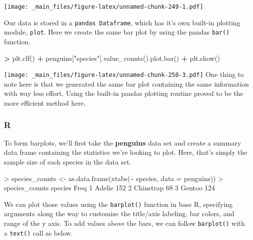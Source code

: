 \documentclass[
]{book}
\newenvironment{Shaded}{\begin{snugshade}}{\end{snugshade}}
\newcommand{\AttributeTok}[1]{\textcolor[rgb]{0.77,0.63,0.00}{#1}}
\newcommand{\DecValTok}[1]{\textcolor[rgb]{0.00,0.00,0.81}{#1}}
\newcommand{\FunctionTok}[1]{\textcolor[rgb]{0.00,0.00,0.00}{#1}}
\newcommand{\NormalTok}[1]{#1}
\newcommand{\OperatorTok}[1]{\textcolor[rgb]{0.81,0.36,0.00}{\textbf{#1}}}
\newcommand{\OtherTok}[1]{\textcolor[rgb]{0.56,0.35,0.01}{#1}}
\newcommand{\SpecialCharTok}[1]{\textcolor[rgb]{0.00,0.00,0.00}{#1}}
\newcommand{\StringTok}[1]{\textcolor[rgb]{0.31,0.60,0.02}{#1}}
\begin{document}
\texttt{[image: \_main\_files/figure-latex/unnamed-chunk-249-1.pdf]}

Our data is stored in a \texttt{pandas\ Dataframe}, which has it's own built-in plotting module, \texttt{plot}. Here we create the same bar plot by using the pandas \texttt{bar()} function.

\begin{Shaded}
\begin{Highlighting}[]
\OperatorTok{\textgreater{}}\NormalTok{ plt.clf()}
\OperatorTok{+}\NormalTok{ penguins[}\StringTok{"species"}\NormalTok{].value\_counts().plot.bar()}
\OperatorTok{+}\NormalTok{ plt.show()}
\end{Highlighting}
\end{Shaded}

\texttt{[image: \_main\_files/figure-latex/unnamed-chunk-250-3.pdf]}
One thing to note here is that we generated the same bar plot containing the same information with way less effort. Using the built-in pandas plotting routine proved to be the more efficient method here.

\hypertarget{r-40}{%
\subsubsection*{R}\label{r-40}}

To form barplots, we'll first take the \textbf{penguins} data set and create a summary data frame containing the statistics we're looking to plot. Here, that's simply the sample size of each species in the data set.

\begin{Shaded}
\begin{Highlighting}[]
\SpecialCharTok{\textgreater{}}\NormalTok{ species\_counts }\OtherTok{\textless{}{-}} \FunctionTok{as.data.frame}\NormalTok{(}\FunctionTok{xtabs}\NormalTok{(}\SpecialCharTok{\textasciitilde{}}\NormalTok{ species, }\AttributeTok{data =}\NormalTok{ penguins))}
\SpecialCharTok{\textgreater{}}\NormalTok{ species\_counts}
\NormalTok{    species Freq}
\DecValTok{1}\NormalTok{    Adelie  }\DecValTok{152}
\DecValTok{2}\NormalTok{ Chinstrap   }\DecValTok{68}
\DecValTok{3}\NormalTok{    Gentoo  }\DecValTok{124}
\end{Highlighting}
\end{Shaded}

We can plot those values using the \texttt{barplot()} function in base R, specifying arguments along the way to customize the title/axis labeling, bar colors, and range of the y axis. To add values above the bars, we can follow \texttt{barplot()} with a \texttt{text()} call as below.
\end{document}

